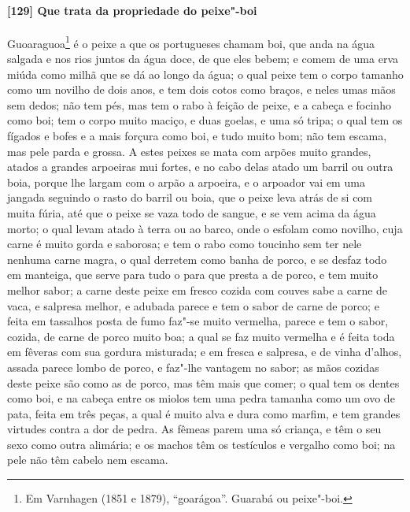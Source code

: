 \begin{linenumbers}
\paragraph{[129] Que trata da propriedade do peixe"-boi}\quad
Guoaraguoa\footnote{ Em Varnhagen (1851 e 1879), ``goarágoa''. Guarabá ou peixe"-boi.} é o
peixe a que os portugueses chamam boi, que anda na água salgada e nos rios juntos da água
doce, de que eles bebem; e comem de uma erva miúda como milhã que se dá ao longo da água;
o qual peixe tem o corpo tamanho como um novilho de dois anos, e tem dois cotos como
braços, e neles umas mãos sem dedos; não tem pés, mas tem o rabo à feição de peixe, e a
cabeça e focinho como boi; tem o corpo muito maciço, e duas goelas, e uma só tripa; o qual
tem os fígados e bofes e a mais forçura como boi, e tudo muito bom; não tem escama, mas
pele parda e grossa. A estes peixes se mata com arpões muito grandes, atados a grandes
arpoeiras mui fortes, e no cabo delas atado um barril ou outra boia, porque lhe largam com
o arpão a arpoeira, e o arpoador vai em uma jangada seguindo o rasto do barril ou boia,
que o peixe leva atrás de si com muita fúria, até que o peixe se vaza todo de sangue, e se
vem acima da água morto; o qual levam atado à terra ou ao barco, onde o esfolam como
novilho, cuja carne é muito gorda e saborosa; e tem o rabo como toucinho sem ter nele
nenhuma carne magra, o qual derretem como banha de porco, e se desfaz todo em manteiga,
que serve para tudo o para que presta a de porco, e tem muito melhor sabor; a carne deste
peixe em fresco cozida com couves sabe a carne de vaca, e salpresa melhor, e adubada
parece e tem o sabor de carne de porco; e feita em tassalhos posta de fumo faz"-se muito
vermelha, parece e tem o sabor, cozida, de carne de porco muito boa; a qual se faz muito
vermelha e é feita toda em fêveras com sua gordura misturada; e em fresca e salpresa, e de
vinha d'alhos, assada parece lombo de porco, e faz"-lhe vantagem no sabor; as mãos cozidas
deste peixe são como as de porco, mas têm mais que comer; o qual tem os dentes como boi, e
na cabeça entre os miolos tem uma pedra tamanha como um ovo de pata, feita em três peças,
a qual é muito alva e dura como marfim, e tem grandes virtudes contra a dor de pedra. As
fêmeas parem uma só criança, e têm o seu sexo como outra alimária; e os machos têm os
testículos e vergalho como boi; na pele não têm cabelo nem escama.


\end{linenumbers}
